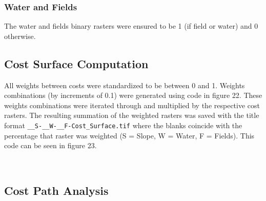 \documentclass[article,12pt]{article}
\numberwithin{equation}{section}
\begin{document}
\subsubsection{Water and Fields}

The water and fields binary rasters were ensured to be 1 (if field or water) and 0 otherwise. 
\newpage
\subsection{Cost Surface Computation}

	All weights between costs were standardized to be between 0 and 1. Weights combinations (by increments of 0.1) were generated using code in figure 22. These weights combinations were iterated through and multiplied by the respective cost rasters. The resulting summation of the weighted rasters was saved with the title format \texttt{\_\_S-\_\_W-\_\_F-Cost\_Surface.tif} where the blanks coincide with the percentage that raster was weighted (S = Slope, W = Water, F = Fields). This code can be seen in figure 23.
	
\begin{adjustwidth}{-.8in}{-.8in}
\begin{multicols}{2}
	\\	


\end{multicols}
\end{adjustwidth}
\newpage
\subsection{Cost Path Analysis}
\end{document}
